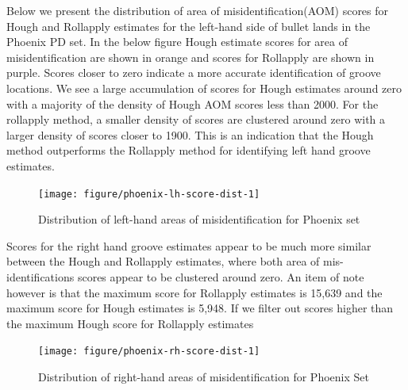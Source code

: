 \documentclass[12pt]{article}\usepackage[]{graphicx}\usepackage[]{color}
\newenvironment{knitrout}{}{} %
\theoremstyle{nonumberplain}
\begin{document}
 
Below we present the distribution of area of misidentification(AOM) scores for Hough and Rollapply estimates for the left-hand side of bullet lands in the Phoenix PD set. In the below figure Hough estimate scores for area of misidentification are shown in orange and scores for Rollapply are shown in purple. Scores closer to zero indicate a more accurate identification of groove locations. We see a large accumulation of scores for Hough estimates around zero with a majority of the density of Hough AOM scores less than 2000. For the rollapply method, a smaller density of scores are clustered around zero with a larger density of scores closer to 1900. This is an indication that the Hough method outperforms the Rollapply method for identifying left hand groove estimates.


\begin{knitrout}
\color{fgcolor}\begin{figure}

{\centering \texttt{[image: figure/phoenix-lh-score-dist-1]} 

}

\caption[Distribution of left-hand areas of misidentification for Phoenix set]{Distribution of left-hand areas of misidentification for Phoenix set}\label{fig:phoenix-lh-score-dist}
\end{figure}


\end{knitrout}


Scores for the right hand groove estimates appear to be much more similar between the Hough and Rollapply estimates, where both area of mis-identifications scores appear to be clustered around zero. An item of note however is that the maximum score for Rollapply estimates is 15,639 and the maximum score for Hough estimates is 5,948. If we filter out scores higher than the maximum Hough score for Rollapply estimates

\begin{knitrout}
\color{fgcolor}\begin{figure}

{\centering \texttt{[image: figure/phoenix-rh-score-dist-1]} 

}

\caption[Distribution of right-hand areas of misidentification for Phoenix Set]{Distribution of right-hand areas of misidentification for Phoenix Set}\label{fig:phoenix-rh-score-dist}
\end{figure}


\end{knitrout}
\end{document}
